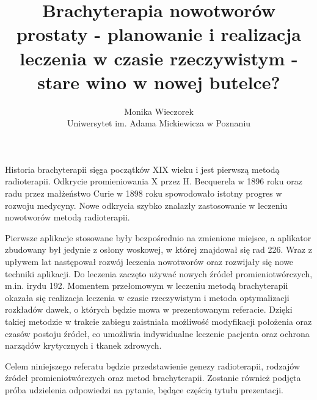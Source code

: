 \documentclass[12pt, a4paper]{article}
\begin{document}
\title{Brachyterapia nowotworów prostaty - planowanie i realizacja leczenia w czasie rzeczywistym - stare wino w nowej butelce?}
\author{Monika Wieczorek \\ Uniwersytet im. Adama Mickiewicza w Poznaniu}
\date {}
\maketitle
\thispagestyle{title}

Historia brachyterapii sięga początków XIX wieku i jest pierwszą metodą radioterapii. Odkrycie promieniowania X przez H. Becquerela w 1896 roku oraz radu przez małżeństwo Curie w 1898 roku spowodowało istotny progres w rozwoju medycyny. Nowe odkrycia szybko znalazły zastosowanie w leczeniu nowotworów metodą radioterapii. 

Pierwsze aplikacje stosowane były bezpośrednio na zmienione miejsce, a aplikator zbudowany był jedynie z osłony woskowej, w której znajdował się rad 226.  Wraz z upływem lat następował rozwój leczenia nowotworów oraz rozwijały się nowe techniki aplikacji. Do leczenia zaczęto używać nowych źródeł promieniotwórczych, m.in. irydu 192. Momentem przełomowym w leczeniu metodą brachyterapii okazała się realizacja leczenia w czasie rzeczywistym i metoda optymalizacji rozkładów dawek, o których będzie mowa w prezentowanym referacie. Dzięki takiej metodzie w trakcie zabiegu zaistniała możliwość modyfikacji położenia oraz czasów postoju źródeł, co umożliwia indywidualne leczenie pacjenta oraz ochrona narządów krytycznych i tkanek zdrowych.

Celem niniejszego referatu będzie przedstawienie genezy radioterapii, rodzajów źródeł promieniotwórczych oraz metod brachyterapii. Zostanie również podjęta próba udzielenia odpowiedzi na pytanie, będące częścią tytułu prezentacji.
\end{document}
